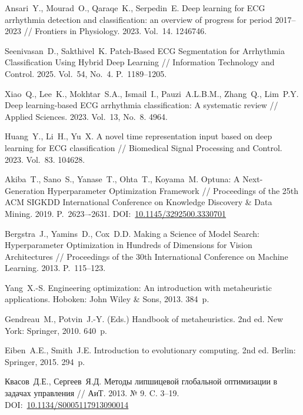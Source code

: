 \documentclass[11pt, oneside, a4paper]{article}
\begin{document}
\begin{biblio}


Ansari~Y., Mourad~O., Qaraqe~K., Serpedin~E. Deep learning for ECG arrhythmia detection and classification: an overview of progress for period 2017–2023 // Frontiers in Physiology. 2023. Vol.~14. 1246746.

Seenivasan~D., Sakthivel~K. Patch-Based ECG Segmentation for Arrhythmia Classification Using Hybrid Deep Learning // Information Technology and Control. 2025. Vol.~54, No.~4. P.~1189--1205.

Xiao~Q., Lee~K., Mokhtar~S.A., Ismail~I., Pauzi~A.L.B.M., Zhang~Q., Lim~P.Y. Deep learning-based ECG arrhythmia classification: A systematic review // Applied Sciences. 2023. Vol.~13, No.~8. 4964.

Huang~Y., Li~H., Yu~X. A novel time representation input based on deep learning for ECG classification // Biomedical Signal Processing and Control. 2023. Vol.~83. 104628.

Akiba~T., Sano~S., Yanase~T.,  Ohta~T., Koyama~M. Optuna: A Next-Generation Hyperparameter Optimization Framework // Proceedings of the 25th ACM SIGKDD International Conference on Knowledge Discovery \& Data Mining. 2019. P.~2623–-2631. DOI:~\href{https://dl.acm.org/doi/10.1145/3292500.3330701}{10.1145/3292500.3330701}

Bergstra~J., Yamins~D., Cox~D.D. Making a Science of Model Search: Hyperparameter Optimization in Hundreds of Dimensions for Vision Architectures // Proceedings of the 30th International Conference on Machine Learning. 2013. P.~115--123.

Yang~X.-S. Engineering optimization: An introduction with metaheuristic applications. Hoboken: John Wiley \& Sons, 2013. 384~p.

Gendreau~M., Potvin~J.-Y. (Eds.) Handbook of metaheuristics. 2nd ed. New York: Springer, 2010. 640~p.

Eiben~A.E., Smith~J.E. Introduction to evolutionary computing. 2nd ed. Berlin: Springer, 2015. 294~p.

Квасов~Д.Е., Сергеев~Я.Д. Методы липшицевой глобальной оптимизации в задачах управления // АиТ. 2013. № 9. C. 3--19. DOI:~\href{https://doi.org/10.1134/S0005117913090014}{10.1134/S0005117913090014}


\end{biblio}
\end{document}
